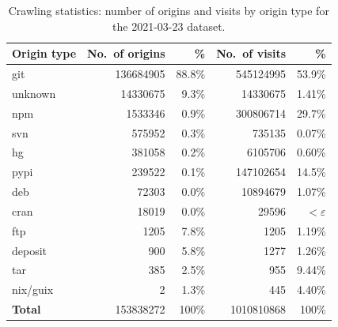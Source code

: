 \begin{table}
  \caption{Crawling statistics: number of origins and visits by origin type for
  the 2021-03-23 dataset.}
  \label{tab:visits-by-type}
  \centering
  \begin{tabular}{l|rr|rr}
    \textbf{Origin type}
    & \textbf{No.~of origins} & \textbf{\%}
    & \textbf{No.~of visits} & \textbf{\%} \\
    \hline
    git      & \num{136684905} & 88.8\% & \num{545124995} & 53.9\% \\
    unknown  & \num{14330675}  & 9.3\%  & \num{14330675 } & 1.41\% \\
    npm      & \num{1533346}   & 0.9\%  & \num{300806714} & 29.7\% \\
    svn      & \num{575952}    & 0.3\%  & \num{735135   } & 0.07\% \\
    hg       & \num{381058}    & 0.2\%  & \num{6105706  } & 0.60\% \\
    pypi     & \num{239522}    & 0.1\%  & \num{147102654} & 14.5\% \\
    deb      & \num{72303}     & 0.0\%  & \num{10894679 } & 1.07\% \\
    cran     & \num{18019}     & 0.0\%  & \num{29596    } & $<\varepsilon$ \\
    ftp      & \num{1205}      & 7.8\%  & \num{1205     } & 1.19\% \\
    deposit  & \num{900}       & 5.8\%  & \num{1277     } & 1.26\% \\
    tar      & \num{385}       & 2.5\%  & \num{955      } & 9.44\% \\
    nix/guix & \num{2}         & 1.3\%  & \num{445      } & 4.40\% \\
    \hline
    \textbf{Total}            & \num{153838272} & 100\%       & \num{1010810868} & 100\% \\
  \end{tabular}
\end{table}

